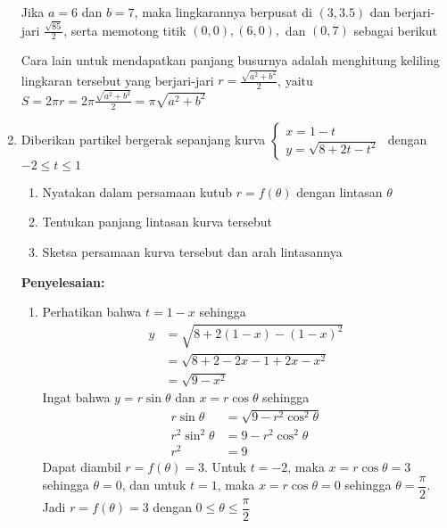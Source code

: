 \documentclass{article}
\begin{document}
\begin{enumerate}
	Jika $a=6$ dan $b=7$, maka lingkarannya berpusat di $(3,3.5)$ dan berjari-jari $\frac{\sqrt{85}}{2}$, serta memotong titik $(0,0),(6,0),$ dan $(0,7)$ sebagai berikut
	\begin{center}
	\end{center}
	Cara lain untuk mendapatkan panjang busurnya adalah menghitung keliling lingkaran tersebut yang berjari-jari $r=\frac{\sqrt{a^2+b^2}}{2}$, yaitu $S=2\pi r=2\pi\frac{\sqrt{a^2+b^2}}{2}=\pi\sqrt{a^2+b^2}$
	\item Diberikan partikel bergerak sepanjang kurva $\begin{cases}x=1-t\\ y=\sqrt{8+2t-t^2}\end{cases}$ dengan $-2\leq t\leq 1$
	\begin{enumerate}
		\item Nyatakan dalam persamaan kutub $r=f(\theta)$ dengan lintasan $\theta$
		\item Tentukan panjang lintasan kurva tersebut
		\item Sketsa persamaan kurva tersebut dan arah lintasannya 
	\end{enumerate}
	\textbf{Penyelesaian:}
	\begin{enumerate}
		\item Perhatikan bahwa $t=1-x$ sehingga
		\begin{align*}
		y&=\sqrt{8+2(1-x)-(1-x)^2}\\
		&=\sqrt{8+2-2x-1+2x-x^2}\\
		&= \sqrt{9-x^2}
		\end{align*}
		Ingat bahwa $y=r\sin\theta$ dan $x=r\cos\theta$ sehingga
		\begin{align*}
		r\sin\theta &=\sqrt{9-r^2\cos^2\theta}\\
		r^2\sin^2\theta &= 9-r^2\cos^2\theta\\
		r^2 &= 9
		\end{align*}
		Dapat diambil $r=f(\theta)=3$. Untuk $t=-2$, maka $x=r\cos\theta=3$ sehingga $\theta=0$, dan untuk $t=1$, maka $x=r\cos\theta=0$ sehingga $\theta=\dfrac{\pi}{2}$. Jadi $r=f(\theta)=3$ dengan $0\leq \theta\leq\dfrac{\pi}{2}$

\end{enumerate}
\end{enumerate}
\end{document}
